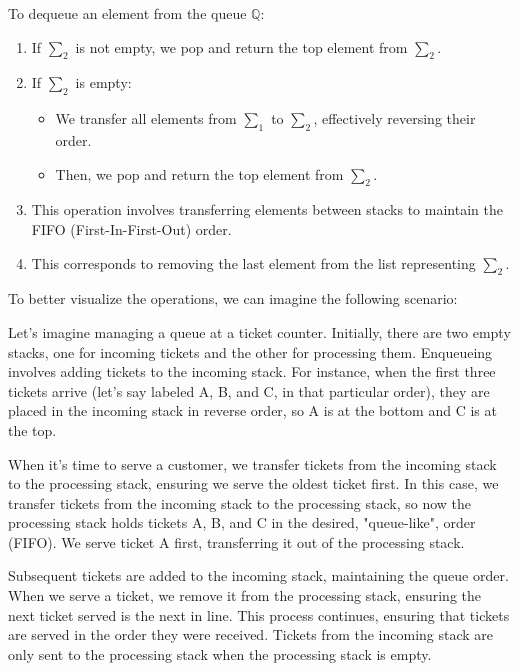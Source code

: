 \documentclass[12pt]{article}
\begin{document}
\begin{spacing}{1.5}
\begin{enumerate}
		      To dequeue an element from the queue $\mathbb{Q}$:
		      		      		      		      
		      \begin{enumerate}
		      	\item If $\sum_2$ is not empty, we pop and return the top element from $\sum_2$.
		      	\item If $\sum_2$ is empty:
		      	      \begin{itemize}
		      	      	\item We transfer all elements from $\sum_1$ to $\sum_2$, effectively reversing their order.
		      	      	\item Then, we pop and return the top element from $\sum_2$.
		      	      \end{itemize}
		      	\item This operation involves transferring elements between stacks to maintain the FIFO (First-In-First-Out) order.
		      	\item This corresponds to removing the last element from the list representing $\sum_2$.
		      \end{enumerate}
		      		      		      		      
		      To better visualize the operations, we can imagine the following scenario:
		      		      		      		      
		      Let's imagine managing a queue at a ticket counter. Initially, there are two empty stacks, one for incoming tickets and the other for processing them. Enqueueing involves adding tickets to the incoming stack. For instance, when the first three tickets arrive (let's say labeled A, B, and C, in that particular order), they are placed in the incoming stack in reverse order, so A is at the bottom and C is at the top.
		      		      		      		              
		      When it's time to serve a customer, we transfer tickets from the incoming stack to the processing stack, ensuring we serve the oldest ticket first. In this case, we transfer tickets from the incoming stack to the processing stack, so now the processing stack holds tickets A, B, and C in the desired, "queue-like", order (FIFO). We serve ticket A first, transferring it out of the processing stack.
		      		      		      		              
		      Subsequent tickets are added to the incoming stack, maintaining the queue order. When we serve a ticket, we remove it from the processing stack, ensuring the next ticket served is the next in line. This process continues, ensuring that tickets are served in the order they were received. Tickets from the incoming stack are only sent to the processing stack when the processing stack is empty.
		      		      		      		      

\end{enumerate}
\end{spacing}
\end{document}
